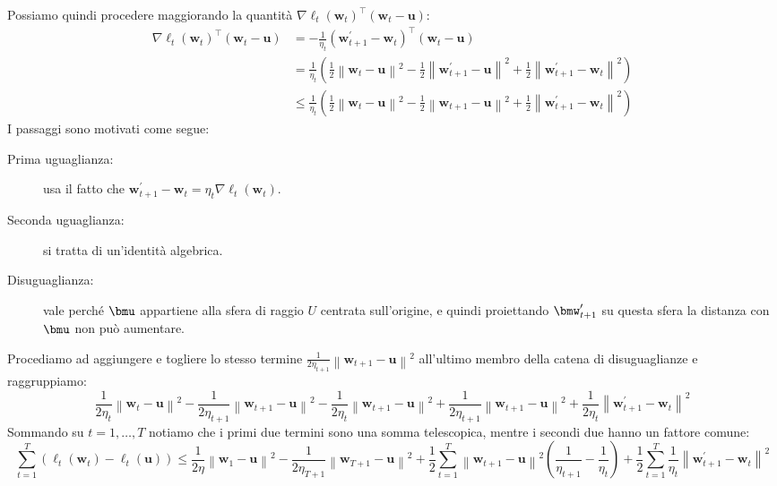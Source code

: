 \documentclass[\main/main.tex]{subfiles}
\begin{document}
\begin{analysis}
    Possiamo quindi procedere maggiorando la quantità \(\nabla \ell_{t}\left(\boldsymbol{w}_{t}\right)^{\top}\left(\boldsymbol{w}_{t}-\boldsymbol{u}\right)\):
    \begin{align*}
    \nabla \ell_{t}\left(\boldsymbol{w}_{t}\right)^{\top}\left(\boldsymbol{w}_{t}-\boldsymbol{u}\right) &=-\frac{1}{\eta_{t}}\left(\boldsymbol{w}_{t+1}^{\prime}-\boldsymbol{w}_{t}\right)^{\top}\left(\boldsymbol{w}_{t}-\boldsymbol{u}\right) \\ &=\frac{1}{\eta_{t}}\left(\frac{1}{2}\left\|\boldsymbol{w}_{t}-\boldsymbol{u}\right\|^{2}-\frac{1}{2}\left\|\boldsymbol{w}_{t+1}^{\prime}-\boldsymbol{u}\right\|^{2}+\frac{1}{2}\left\|\boldsymbol{w}_{t+1}^{\prime}-\boldsymbol{w}_{t}\right\|^{2}\right) \\ & \leq \frac{1}{\eta_{t}}\left(\frac{1}{2}\left\|\boldsymbol{w}_{t}-\boldsymbol{u}\right\|^{2}-\frac{1}{2}\left\|\boldsymbol{w}_{t+1}-\boldsymbol{u}\right\|^{2}+\frac{1}{2}\left\|\boldsymbol{w}_{t+1}^{\prime}-\boldsymbol{w}_{t}\right\|^{2}\right)
    \end{align*}
    I passaggi sono motivati come segue:
    \begin{description}
        \item[Prima uguaglianza:] usa il fatto che \(\boldsymbol{w}_{t+1}^{\prime}-\boldsymbol{w}_{t}=\eta_{t} \nabla \ell_{t}\left(\boldsymbol{w}_{t}\right)\).
        \item[Seconda uguaglianza:] si tratta di un'identità algebrica.
        \item[Disuguaglianza:] vale perché \(\bmu\) appartiene alla sfera di raggio \(U\) centrata sull'origine, e quindi proiettando \(\bmw'_{t+1}\) su questa sfera la distanza con \(\bmu\) non può aumentare.
    \end{description}
    Procediamo ad aggiungere e togliere lo stesso termine \(\frac{1}{2 \eta_{t+1}}\left\|\boldsymbol{w}_{t+1}-\boldsymbol{u}\right\|^{2}\) all'ultimo membro della catena di disuguaglianze e raggruppiamo:
    \[\frac{1}{2 \eta_{t}}\left\|\boldsymbol{w}_{t}-\boldsymbol{u}\right\|^{2}-\frac{1}{2 \eta_{t+1}}\left\|\boldsymbol{w}_{t+1}-\boldsymbol{u}\right\|^{2}-\frac{1}{2 \eta_{t}}\left\|\boldsymbol{w}_{t+1}-\boldsymbol{u}\right\|^{2}+\frac{1}{2 \eta_{t+1}}\left\|\boldsymbol{w}_{t+1}-\boldsymbol{u}\right\|^{2}+\frac{1}{2 \eta_{t}}\left\|\boldsymbol{w}_{t+1}^{\prime}-\boldsymbol{w}_{t}\right\|^2\]
    Sommando su \(t=1,\ldots,T\) notiamo che i primi due termini sono una somma telescopica, mentre i secondi due hanno un fattore comune:
    \[
        \sum_{t=1}^{T}\left(\ell_{t}\left(\boldsymbol{w}_{t}\right)-\ell_{t}(\boldsymbol{u})\right) \leq \frac{1}{2 \eta}\left\|\boldsymbol{w}_{1}-\boldsymbol{u}\right\|^{2}-\frac{1}{2 \eta_{T+1}} \left\|\boldsymbol{w}_{T+1}-\boldsymbol{u}\right\|^{2} +\frac{1}{2} \sum_{t=1}^{T}\left\|\boldsymbol{w}_{t+1}-\boldsymbol{u}\right\|^{2}\left(\frac{1}{\eta_{t+1}}-\frac{1}{\eta_{t}}\right)+\frac{1}{2} \sum_{t=1}^{T} \frac{1}{\eta_{t}}\left\|\boldsymbol{w}_{t+1}^{\prime}-\boldsymbol{w}_{t}\right\|^{2}
\]
\end{analysis}
\end{document}
